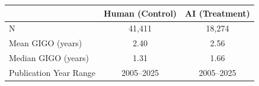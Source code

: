 \begin{tabular}{lcc}
\toprule
& \textbf{Human (Control)} & \textbf{AI (Treatment)} \\
\midrule
N & 41,411 & 18,274 \\
Mean GIGO (years) & 2.40 & 2.56 \\
Median GIGO (years) & 1.31 & 1.66 \\
Publication Year Range & 2005--2025 & 2005--2025 \\
\bottomrule
\end{tabular}